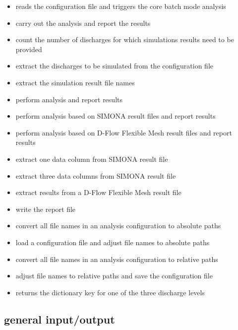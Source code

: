\begin{itemize}
\item {} reads the configuration file and triggers the core batch mode analysis
\item {} carry out the analysis and report the results
\item {} count the number of discharges for which simulations results need to be provided
\item {} extract the discharges to be simulated from the configuration file
\item {} extract the simulation result file names
\item {} perform analysis and report results
\item {} perform analysis based on SIMONA result files and report results
\item {} perform analysis based on D-Flow Flexible Mesh result files and report results
\item {} extract one data column from SIMONA result file
\item {} extract three data columns from SIMONA result file
\item {} extract results from a D-Flow Flexible Mesh result file
\item {} write the report file
\item {} convert all file names in an analysis configuration to absolute paths
\item {} load a configuration file and adjust file names to absolute paths
\item {} convert all file names in an analysis configuration to relative paths
\item {} adjust file names to relative paths and save the configuration file
\item {} returns the dictionary key for one of the three discharge levels
\end{itemize}


\subsection{general input/output }

